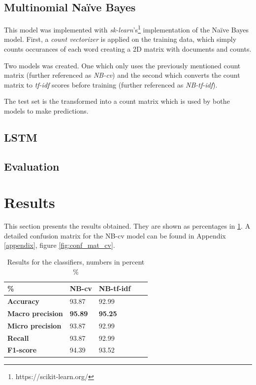 \documentclass[conference]{IEEEtran}
\begin{document}
\subsection{Multinomial Naïve Bayes}
This model was implemented with \textit{sk-learn}'s\footnote{https://scikit-learn.org/} implementation of the Naïve Bayes model. First, a \textit{count vectorizer} is applied on the training data, which simply counts occurances of each word creating a 2D matrix with documents and counts.

Two models was created. One which only uses the previously mentioned count matrix (further referenced as \textit{NB-cv}) and the second which converts the count matrix to \textit{tf-idf} scores before training (further referenced as \textit{NB-tf-idf}).

The test set is the transformed into a count matrix which is used by bothe models to make predictions.

\subsection{LSTM}

\subsection{Evaluation}



\section{Results}
This section presents the results obtained. They are shown as percentages in \ref{tbl:results}. A detailed confusion matrix for the NB-cv model can be found in Appendix \ref{appendix}, figure \ref{fig:conf_mat_cv}.
\begin{table}[]
  \caption{Results for the classifiers, numbers in percent \%}
  \label{tbl:results}
  \begin{tabular}{l|l|l|l|l}
    \textbf{\%}              & \textbf{NB-cv} & \textbf{NB-tf-idf} &  &  \\ \hline
    \textbf{Accuracy}        & 93.87          & 92.99              &  &  \\ \hline
    \textbf{Macro precision} & \textbf{95.89} & \textbf{95.25}     &  &  \\ \hline
    \textbf{Micro precision} & 93.87          & 92.99              &  &  \\ \hline
    \textbf{Recall}          & 93.87          & 92.99              &  &  \\ \hline
    \textbf{F1-score}        & 94.39          & 93.52              &  & 
    \end{tabular}
  \end{table}
\end{document}
